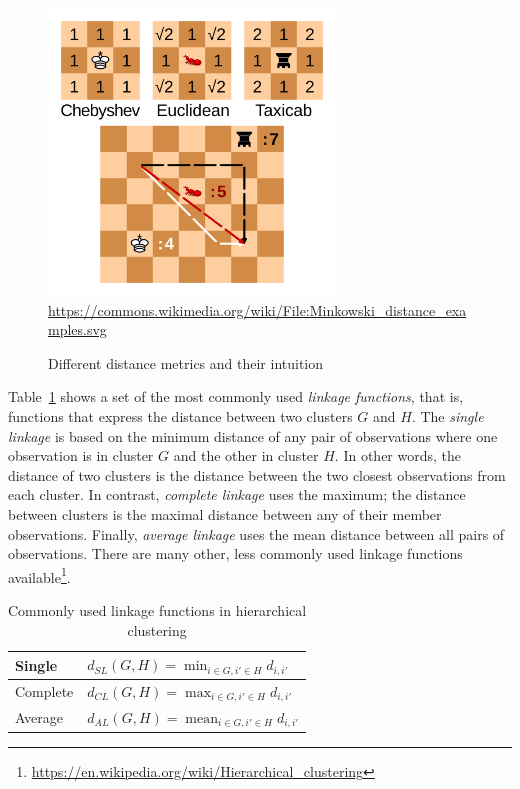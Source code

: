 \begin{figure}
\centering
\includegraphics[height=3in]{Minkowski_distance_examples.svg.png} \\

\scriptsize \url{https://commons.wikimedia.org/wiki/File:Minkowski_distance_examples.svg}
\caption{Different distance metrics and their intuition}
\label{fig:distance}
\end{figure}

Table~\ref{tab:linkages} shows a set of the most commonly used \emph{linkage functions}, that is, functions that express the distance between two clusters $G$ and $H$. The \emph{single linkage} is based on the minimum distance of any pair of observations where one observation is in cluster $G$ and the other in cluster $H$. In other words, the distance of two clusters is the distance between the two closest observations from each cluster. In contrast, \emph{complete linkage} uses the maximum; the distance between clusters is the maximal distance between any of their member observations. Finally, \emph{average linkage} uses the mean distance between all pairs of observations. There are many other, less commonly used linkage functions available\footnote{\url{https://en.wikipedia.org/wiki/Hierarchical_clustering}}.

\begin{table}
\renewcommand{\arraystretch}{1.5}
\centering

\begin{tabular}{l|l} \hline
Single & $\displaystyle d_{SL}(G,H) = \min_{i \in G, i' \in H} d_{i, i'}$  \\ \hline
Complete & $\displaystyle d_{CL}(G,H) = \max_{i \in G, i' \in H} d_{i, i'}$  \\ \hline
Average & $\displaystyle d_{AL}(G,H) = \operatorname*{mean}_{i \in G, i' \in H} d_{i, i'}$  \\ \hline
\end{tabular}
\caption{Commonly used linkage functions in hierarchical clustering}
\label{tab:linkages}
\end{table}

